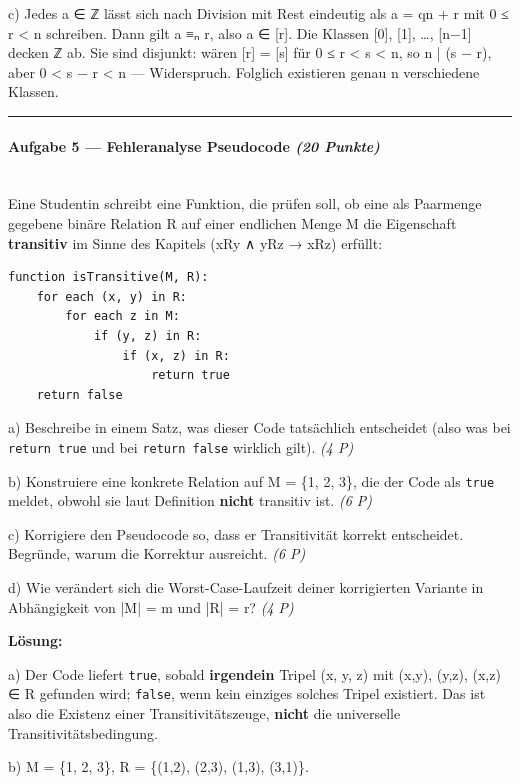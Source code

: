 \documentclass[11pt, a4paper]{article}
\begin{document}
c) Jedes a ∈ ℤ lässt sich nach Division mit Rest eindeutig als a = qn + r mit 0 ≤ r < n schreiben. Dann gilt a ≡ₙ r, also a ∈ [r]. Die Klassen [0], [1], …, [n−1] decken ℤ ab. Sie sind disjunkt: wären [r] = [s] für 0 ≤ r < s < n, so n | (s − r), aber 0 < s − r < n — Widerspruch. Folglich existieren genau n verschiedene Klassen.



\noindent\textcolor{rulegray}{\rule{\linewidth}{0.4pt}}


\paragraph{Aufgabe 5 — Fehleranalyse Pseudocode \textit{(20 Punkte)}}\mbox{}\\[2pt]

Eine Studentin schreibt eine Funktion, die prüfen soll, ob eine als Paarmenge gegebene binäre Relation R auf einer endlichen Menge M die Eigenschaft \textbf{transitiv} im Sinne des Kapitels (xRy ∧ yRz → xRz) erfüllt:


\begin{lstlisting}
function isTransitive(M, R):
    for each (x, y) in R:
        for each z in M:
            if (y, z) in R:
                if (x, z) in R:
                    return true
    return false
\end{lstlisting}


a) Beschreibe in einem Satz, was dieser Code tatsächlich entscheidet (also was bei \texttt{return true} und bei \texttt{return false} wirklich gilt). \textit{(4 P)}

b) Konstruiere eine konkrete Relation auf M = \{1, 2, 3\}, die der Code als \texttt{true} meldet, obwohl sie laut Definition \textbf{nicht} transitiv ist. \textit{(6 P)}

c) Korrigiere den Pseudocode so, dass er Transitivität korrekt entscheidet. Begründe, warum die Korrektur ausreicht. \textit{(6 P)}

d) Wie verändert sich die Worst-Case-Laufzeit deiner korrigierten Variante in Abhängigkeit von |M| = m und |R| = r? \textit{(4 P)}


\textbf{Lösung:}


a) Der Code liefert \texttt{true}, sobald \textbf{irgendein} Tripel (x, y, z) mit (x,y), (y,z), (x,z) ∈ R gefunden wird; \texttt{false}, wenn kein einziges solches Tripel existiert. Das ist also die Existenz einer Transitivitätszeuge, \textbf{nicht} die universelle Transitivitätsbedingung.


b) M = \{1, 2, 3\}, R = \{(1,2), (2,3), (1,3), (3,1)\}.
\end{document}
